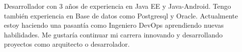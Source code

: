 \par{
Desarrollador con 3 años de experiencia en Java EE y Java-Android. Tengo también
experiencia en Base de datos como Postgresql y Oracle. Actualmente estoy haciendo una pasantía como
Ingeniero DevOps aprendiendo nuevas habilidades. Me gustaría continuar mi carrera innovando y desarrollando
proyectos como arquitecto o desarrolador.
}
